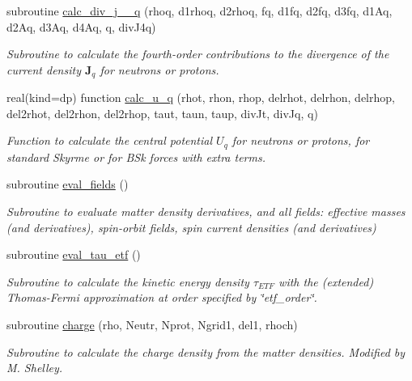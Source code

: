 \begin{DoxyCompactItemize}
subroutine \mbox{\hyperlink{namespaceroutines_a7f66729f05be35eda4266dbf47eda026}{calc\+\_\+div\+\_\+j\+\_\+\_\+q}} (rhoq, d1rhoq, d2rhoq, fq, d1fq, d2fq, d3fq, d1\+Aq, d2\+Aq, d3\+Aq, d4\+Aq, q, div\+J4q)
\begin{DoxyCompactList}\small\item\em Subroutine to calculate the fourth-\/order contributions to the divergence of the current density $\textbf{J}_q$ for neutrons or protons. \end{DoxyCompactList}\item 
real(kind=dp) function \mbox{\hyperlink{namespaceroutines_a2a44c591985c939162dabdeab4a4ced8}{calc\+\_\+u\+\_\+q}} (rhot, rhon, rhop, delrhot, delrhon, delrhop, del2rhot, del2rhon, del2rhop, taut, taun, taup, div\+Jt, div\+Jq, q)
\begin{DoxyCompactList}\small\item\em Function to calculate the central potential $U_q$ for neutrons or protons, for standard Skyrme or for B\+Sk forces with extra terms. \end{DoxyCompactList}\item 
subroutine \mbox{\hyperlink{namespaceroutines_aa995449a9eb9c404dbd756bdbea180a2}{eval\+\_\+fields}} ()
\begin{DoxyCompactList}\small\item\em Subroutine to evaluate matter density derivatives, and all fields\+: effective masses (and derivatives), spin-\/orbit fields, spin current densities (and derivatives) \end{DoxyCompactList}\item 
subroutine \mbox{\hyperlink{namespaceroutines_a97bfcff7e603cf9df3dcd48ae21b4612}{eval\+\_\+tau\+\_\+etf}} ()
\begin{DoxyCompactList}\small\item\em Subroutine to calculate the kinetic energy density $\tau_{ETF}$ with the (extended) Thomas-\/\+Fermi approximation at order specified by \char`\"{}etf\+\_\+order\char`\"{}. \end{DoxyCompactList}\item 
subroutine \mbox{\hyperlink{namespaceroutines_afb83677ec76758dadc35de4b01bac45c}{charge}} (rho, Neutr, Nprot, Ngrid1, del1, rhoch)
\begin{DoxyCompactList}\small\item\em Subroutine to calculate the charge density from the matter densities. Modified by M. Shelley. \end{DoxyCompactList}\item 

\end{DoxyCompactItemize}

